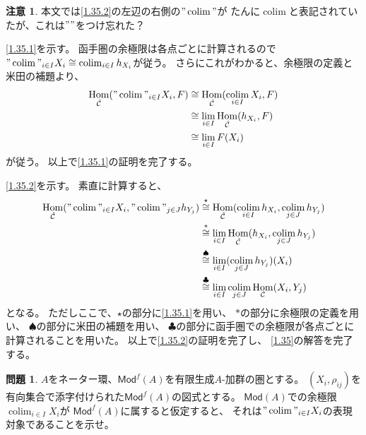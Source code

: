 \documentclass[uplatex,dvipdfmx]{jsarticle}
\makeatletter
\theoremstyle{definition}
\newtheorem{prob}[prob]{問題}
\newtheorem*{rem*}{注意}
\renewenvironment{proof}[1][\proofname]{
  \pushQED{\qed}%
  \normalfont \topsep6\p@\@plus6\p@\relax
  \trivlist
  \item[\hskip\labelsep
    #1\@addpunct{\textbf{.}}]\ignorespaces
}{%
  \popQED\endtrivlist\@endpefalse
}
\providecommand{\proofname}{証明}
\DeclareMathOperator{\Hom}{\mathrm{Hom}}
\DeclareMathOperator{\colim}{\mathrm{colim}}
\newcommand{\Mod}{\mathsf{Mod}}
\newcommand\mcC{\mathcal{C}}
\makeatother
\begin{document}
\begin{rem*}
  本文では\ref{1.35.2}の左辺の右側の\("\colim"\)が
  たんに\(\colim\)と表記されていたが、これは\(""\)をつけ忘れた？
\end{rem*}

\begin{proof}
  \ref{1.35.1}を示す。
  函手圏の余極限は各点ごとに計算されるので
  \("\colim"_{i\in I} X_i\cong \colim_{i\in I}h_{X_i}\)が従う。
  さらにこれがわかると、余極限の定義と米田の補題より、
  \begin{align*}
    \Hom_{\hat{\mcC}}("\colim"_{i\in I} X_i, F)
    &\cong \Hom_{\hat{\mcC}}(\colim_{i\in I} X_i, F) \\
    &\cong \lim_{i\in I}\Hom_{\hat{\mcC}}(h_{X_i}, F) \\
    &\cong \lim_{i\in I}F(X_i)
  \end{align*}
  が従う。
  以上で\ref{1.35.1}の証明を完了する。

  \ref{1.35.2}を示す。
  素直に計算すると、
  \begin{align*}
    \Hom_{\hat{\mcC}}("\colim"_{i\in I} X_i, "\colim"_{j\in J} h_{Y_j})
    &\overset{\star}{\cong}
    \Hom_{\hat{\mcC}}(\colim_{i\in I} h_{X_i}, \colim_{j\in J} h_{Y_j}) \\
    &\overset{*}{\cong}
    \lim_{i\in I}\Hom_{\hat{\mcC}}(h_{X_i}, \colim_{j\in J} h_{Y_j}) \\
    &\overset{\scriptstyle\spadesuit}{\cong}
    \lim_{i\in I}(\colim_{j\in J} h_{Y_j})(X_i) \\
    &\overset{\scriptstyle\clubsuit}{\cong}
    \lim_{i\in I}\colim_{j\in J}\Hom_{\mcC}(X_i,Y_j)
  \end{align*}
  となる。
  ただしここで、\(\star\)の部分に\ref{1.35.1}を用い、
  \(*\)の部分に余極限の定義を用い、
  \(\spadesuit\)の部分に米田の補題を用い、
  \(\clubsuit\)の部分に函手圏での余極限が各点ごとに計算されることを用いた。
  以上で\ref{1.35.2}の証明を完了し、
  \autoref{1.35}の解答を完了する。
\end{proof}




\begin{prob}\label{1.36}
  \(A\)をネーター環、\(\Mod^f(A)\)を有限生成\(A\)-加群の圏とする。
  \((X_i,\rho_{ij})\)を有向集合で添字付けられた\(\Mod^f(A)\)の図式とする。
  \(\Mod(A)\)での余極限\(\colim_{i\in I}X_i\)が
  \(\Mod^f(A)\)に属すると仮定すると、
  それは\("\colim"_{i\in I}X_i\)の表現対象であることを示せ。
\end{prob}
\end{document}
